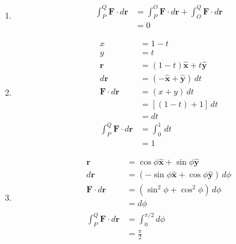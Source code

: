 \documentclass{article}
\renewcommand{\vec}[1]{\boldsymbol{\mathbf{#1}}}
\newcommand{\uvec}[1]{\hat{\vec{#1}}}
\begin{document}
\begin{enumerate}
  \item

        \begin{align*}
          \int_P^Q \vec{F} \cdot d \vec{r} & = \int_P^O \vec{F} \cdot d \vec{r} + \int_O^Q \vec{F} \cdot d \vec{r} \\
                                           & = 0
        \end{align*}

  \item

        \begin{align*}
          x                                & = 1 - t                         \\
          y                                & = t                             \\
          \vec{r}                          & = (1 - t) \uvec{x} + t \uvec{y} \\
          d \vec{r}                        & = (-\uvec{x} + \uvec{y}) \,d t  \\
          \vec{F} \cdot d \vec{r}          & = (x + y) \,d t                 \\
                                           & = [(1 - t) + 1] \,d t           \\
                                           & = d t                           \\
          \int_P^Q \vec{F} \cdot d \vec{r} & = \int_0^1 \,d t                \\
                                           & = 1
        \end{align*}

  \item

        \begin{align*}
          \vec{r}                          & = \cos \phi \uvec{x} + \sin \phi \uvec{y}             \\
          d \vec{r}                        & = (-\sin \phi \uvec{x} + \cos \phi \uvec{y}) \,d \phi \\
          \vec{F} \cdot d \vec{r}          & = (\sin^2 \phi + \cos^2 \phi) \,d \phi                \\
                                           & = d \phi                                              \\
          \int_P^Q \vec{F} \cdot d \vec{r} & = \int_0^{\pi / 2} d \phi                             \\
                                           & = \frac{\pi}{2}
        \end{align*}
\end{enumerate}
\end{document}
